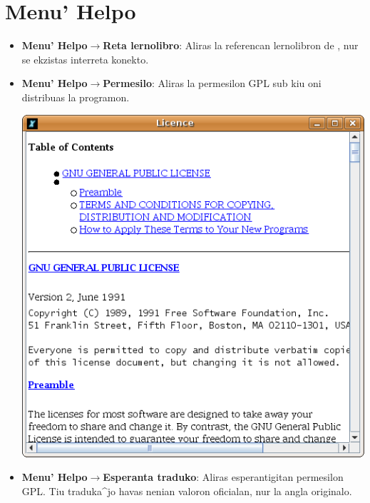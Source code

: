 \section{Menu' \og Helpo\fg}
\begin{itemize}
\item \textbf{Menu' Helpo$\to$Reta lernolibro}: Aliras la referencan
  lernolibron de \xlogo, nur se ekzistas interreta konekto.
  \vspace{0.25cm}
\item \textbf{Menu' Helpo$\to$Permesilo}: Aliras la permesilon GPL sub
  kiu oni distribuas la programon.
  \begin{center}
    \includegraphics[scale=0.4]{bildoj/CaptureLicence.png}
  \end{center}
  \vspace{0.25cm}
\item \textbf{Menu' Helpo$\to$Esperanta traduko}: Aliras
  esperantigitan permesilon GPL.  Tiu traduka^jo havas nenian valoron
  oficialan, nur la angla originalo.


\end{itemize}
